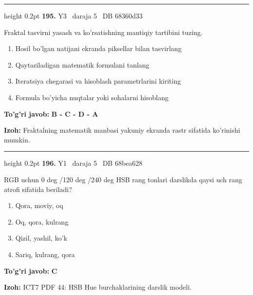 \documentclass[10pt,a4paper,oneside]{article}
\begin{document}
\vspace{2mm}\hrule height 0.2pt \vspace{4mm}
\hypertarget{q195}{\textbf{\color{ink}195.}}  {\color{muted}\scriptsize Y3 \textbullet\ daraja 5 \textbullet\ DB 68360d33}
\par
Fraktal tasvirni yasash va ko'rsatishning mantiqiy tartibini tuzing.
\begin{enumerate}[label=\Alph*),leftmargin=9mm]
\item Hosil bo'lgan natijani ekranda piksellar bilan tasvirlang
\item Qaytariladigan matematik formulani tanlang
\item Iteratsiya chegarasi va hisoblash parametrlarini kiriting
\item Formula bo'yicha nuqtalar yoki sohalarni hisoblang
\end{enumerate}
\begin{tcolorbox}[enhanced,breakable,colback=teal!4,colframe=teal!45!black,boxrule=0.45pt,arc=1.2mm,left=2.8mm,right=2.8mm,top=2mm,bottom=2mm,before skip=2mm,after skip=2mm]
\textbf{\color{teal}To'g'ri javob:} \textbf{B - C - D - A}
\par\smallskip
\textbf{Izoh:} Fraktalning matematik manbasi yakuniy ekranda rastr sifatida ko'rinishi mumkin.
\end{tcolorbox}
\vspace{2mm}\hrule height 0.2pt \vspace{4mm}
\hypertarget{q196}{\textbf{\color{ink}196.}}  {\color{muted}\scriptsize Y1 \textbullet\ daraja 5 \textbullet\ DB 68bea628}
\par
RGB uchun 0 deg /120 deg /240 deg  HSB rang tonlari darslikda qaysi uch rang atrofi sifatida beriladi?
\begin{enumerate}[label=\Alph*),leftmargin=9mm]
\item Qora, moviy, oq
\item Oq, qora, kulrang
\item Qizil, yashil, ko'k
\item Sariq, kulrang, qora
\end{enumerate}
\begin{tcolorbox}[enhanced,breakable,colback=teal!4,colframe=teal!45!black,boxrule=0.45pt,arc=1.2mm,left=2.8mm,right=2.8mm,top=2mm,bottom=2mm,before skip=2mm,after skip=2mm]
\textbf{\color{teal}To'g'ri javob:} \textbf{C}
\par\smallskip
\textbf{Izoh:} ICT7 PDF 44: HSB Hue burchaklarining darslik modeli.
\end{tcolorbox}
\end{document}

